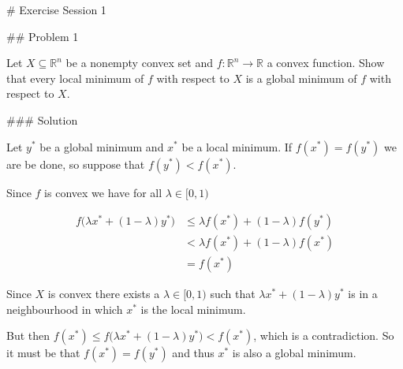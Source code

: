 \documentclass[11pt, a4paper]{article}
\begin{document}
# Exercise Session 1

## Problem 1

Let $X \subseteq \mathbb{R}^n$ be a nonempty convex set and $f : \mathbb{R}^n \to \mathbb{R}$ a convex function. Show that every local minimum of $f$ with respect to $X$ is a global minimum of $f$ with respect to $X$.

### Solution

Let $y^*$ be a global minimum and $x^*$ be a local minimum. If $f(x^*) = f(y^*)$ we are be done, so suppose that $f(y^*) < f(x^*)$.

Since $f$ is convex we have for all $\lambda \in [0, 1)$

\begin{align*}
f \big( \lambda x^* + (1-\lambda) y^* \big) &\le \lambda f(x^*) + (1-\lambda) f(y^*) \\
&< \lambda f(x^*) + (1-\lambda) f(x^*) \\
&= f(x^*)
\end{align*}

Since $X$ is convex there exists a $\lambda \in [0,1)$ such that $\lambda x^* + (1-\lambda) y^*$ is in a neighbourhood in which $x^*$ is the local minimum.

But then $f(x^*) \le f \big( \lambda x^* + (1-\lambda) y^* \big) < f(x^*)$, which is a contradiction. So it must be that $f(x^*) = f(y^*)$ and thus $x^*$ is also a global minimum.
\end{document}
